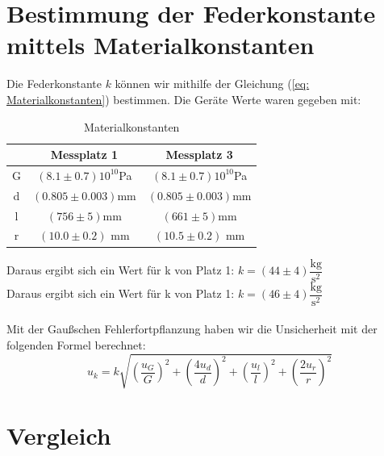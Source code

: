 \documentclass[bibliography=totocnumbered]{scrartcl}
\begin{document}
	\newpage
	\section{Bestimmung der Federkonstante mittels Materialkonstanten}
	Die Federkonstante $ k $ können wir mithilfe der Gleichung (\ref{eq: Materialkonstanten}) bestimmen. Die Geräte Werte waren gegeben mit:
	
	\begin{table}[ht!]
		\centering
		\caption{Materialkonstanten}
		\begin{tabular}{|c|c|c|}
			\hline
			& Messplatz 1 & Messplatz 3 \\
			\hline
			G & $ (8.1\pm0.7)10^{10} $Pa &$ (8.1\pm0.7)10^{10} $Pa   \\
			\hline
			d & $ (0.805\pm0.003) $mm &$ (0.805\pm0.003) $mm \\
			\hline
			l & $ (756\pm 5) $mm &$ (661\pm 5) $mm  \\
			\hline
			r & $ (10.0\pm 0.2) $ mm& $ (10.5\pm 0.2) $ mm \\
			\hline
		\end{tabular}
		\label{tab: Angaben Materialkonstanten}
	\end{table}

	Daraus ergibt sich ein Wert für k von Platz 1: $ k=(44\pm 4)\dfrac{\text{kg}}{\text{s}^{2}} $\\
	Daraus ergibt sich ein Wert für k von Platz 1: $ k=(46\pm4)\dfrac{\text{kg}}{\text{s}^{2}} $\\
	\\
	Mit der Gaußschen Fehlerfortpflanzung haben wir die Unsicherheit mit  der folgenden Formel berechnet:
	\begin{equation}\label{eq: Fp k aus Materialkonstanten}
		u_{k}=k\sqrt{\left(\dfrac{u_{G}}{G}\right)^{2}+\left(\dfrac{4 u_{d}}{d}\right)^{2}+\left(\dfrac{u_{l}}{l}\right)^{2}+\left(\dfrac{2 u_{r}}{r}\right)^{2}}
	\end{equation}
	
	
	
	\section{Vergleich}
	
\end{document}
